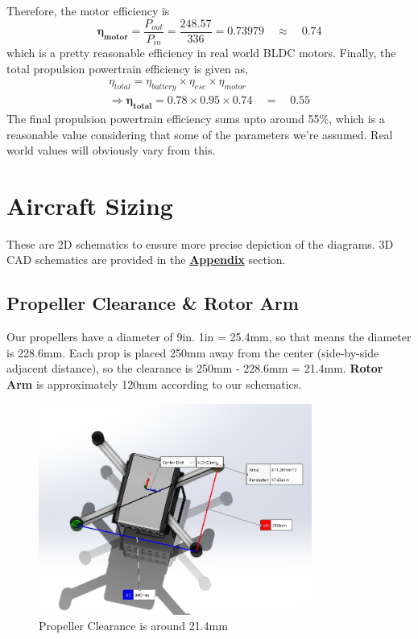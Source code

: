 \documentclass[12pt]{report}
\begin{document}
  Therefore, the motor efficiency is \[ \boldsymbol{\eta_{motor}} = \frac{P_{out}}{P_{in}} = \frac{248.57}{336} = 0.73979 \quad \approx \quad \boldsymbol{0.74} \] which is a pretty reasonable efficiency in real world BLDC motors. Finally, the total propulsion powertrain efficiency is given as, 
  \begin{gather*}
    \eta_{total} = \eta_{battery} \times \eta_{esc} \times \eta_{motor} \\
    \Rightarrow \boldsymbol{\eta_{total}} = 0.78 \times 0.95 \times 0.74 \quad = \quad \boldsymbol{0.55}
  \end{gather*}
  The final propulsion powertrain efficiency sums upto around 55\%, which is a reasonable value considering that some of the parameters we're assumed. Real world values will obviously vary from this.
      
     
    \section{Aircraft Sizing}
    These are 2D schematics to ensure more precise depiction of the diagrams. 3D CAD schematics are provided in the \hyperref[chap:appendix]{\textbf{Appendix}} section.

    \subsection*{Propeller Clearance \& Rotor Arm}
    Our propellers have a diameter of 9in. 1in = 25.4mm, so that means the diameter is 228.6mm. Each prop is placed 250mm away from the center (side-by-side adjacent distance), so the clearance is 250mm - 228.6mm = 21.4mm. \textbf{Rotor Arm} is approximately 120mm according to our schematics.
    \begin{figure}[H]
        \begin{center}
            \includegraphics[width=0.8\textwidth]{prop_clear.jpeg}
        \end{center}
        \caption{\small Propeller Clearance is around 21.4mm}\label{fig:propclear}
    \end{figure}
      
\end{document}
